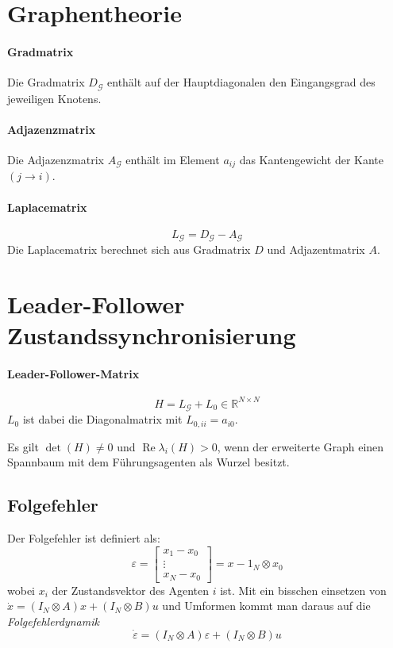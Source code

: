 \section{Graphentheorie}
\paragraph{Gradmatrix}
Die Gradmatrix $D_\mathcal{G}$ enthält auf der Hauptdiagonalen den Eingangsgrad des jeweiligen Knotens.

\paragraph{Adjazenzmatrix}
Die Adjazenzmatrix $A_\mathcal{G}$ enthält im Element $a_{ij}$
das Kantengewicht der Kante $(j \rightarrow i)$.

\paragraph{Laplacematrix}
\begin{equation}
    \tag{Laplacematrix}
    L_\mathcal{G} = D_\mathcal{G} - A_\mathcal{G}
    \label{eqn:laplace_matrix}
\end{equation}
Die Laplacematrix berechnet sich aus Gradmatrix $D$ und
Adjazentmatrix $A$.

\section{Leader-Follower Zustandssynchronisierung}
\paragraph{Leader-Follower-Matrix}
\label{par:leader_follower_matrix}
\begin{equation}
    \tag{Leader-Follower-Matrix}
    H = L_\mathcal{G} + L_0 \in \mathbb{R}^{N\times N}
    \label{eqn:lf_matrix}
\end{equation}
$L_0$ ist dabei die Diagonalmatrix mit $L_{0,ii}=a_{i0}$.

Es gilt $\det(H) \neq 0$ und $\operatorname{Re}\lambda_i(H) > 0$,
wenn der erweiterte Graph einen Spannbaum mit dem Führungsagenten als
Wurzel besitzt.

\subsection{Folgefehler}
Der Folgefehler ist definiert als:
\begin{equation}
    \varepsilon = \begin{bmatrix}
        x_1-x_0 \\
        \vdots \\
        x_N-x_0
    \end{bmatrix}
    = x-1_N \otimes x_0
\end{equation}
wobei $x_i$ der Zustandsvektor des Agenten $i$ ist.
Mit ein bisschen einsetzen von $\dot{x} = (I_N \otimes A)x + (I_N \otimes B)u$
und Umformen kommt man daraus auf die \emph{Folgefehlerdynamik}
\begin{equation}
    \dot{\varepsilon} = (I_N \otimes A)\varepsilon + (I_N \otimes B)u
\end{equation}

